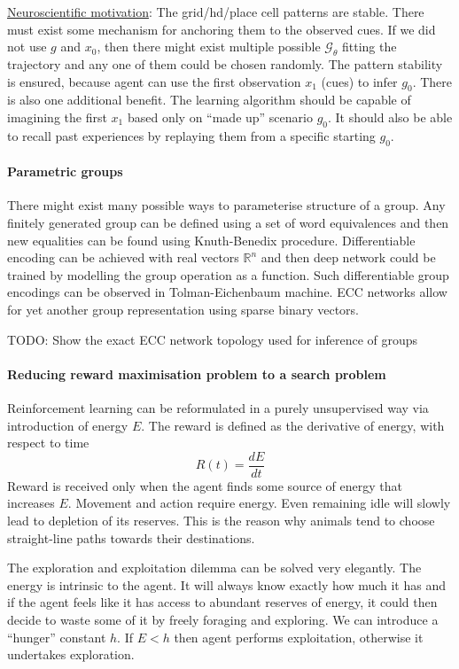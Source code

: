 \documentclass[12pt]{article}
\begin{document}
\underline{Neuroscientific motivation}: The grid/hd/place cell patterns are stable. There must exist some mechanism for anchoring them to the observed cues. If we did not use $g$ and $x_0$, then there might exist multiple possible $\mathcal{G}_\theta$ fitting the trajectory and any one of them could be chosen randomly. The pattern stability is ensured, because agent can use the first observation $x_1$ (cues) to infer $g_0$.
There is also one additional benefit. The learning algorithm should be capable of imagining the first $x_1$ based only on ``made up'' scenario $g_0$. It should also be able to recall past experiences by replaying them from a specific starting $g_0$.

\paragraph{Parametric groups}

There might exist many possible ways to parameterise structure of a group. Any finitely generated group can be defined using a set of word equivalences and then new equalities can be found using Knuth-Benedix procedure. Differentiable encoding can be achieved with real vectors $\mathbb{R}^n$ and then deep network could be trained by modelling the group operation as a function. Such differentiable group encodings can be observed in Tolman-Eichenbaum machine. ECC networks allow for yet another group representation using sparse binary vectors. 

TODO: Show the exact ECC network topology used for inference of groups


\paragraph{Reducing reward maximisation problem to a search problem}
Reinforcement learning can be reformulated in a purely unsupervised way via introduction of energy $E$. The reward is defined as the derivative of energy, with respect to time
\[
R(t) = \frac{dE}{dt}
\]
Reward is received only when the agent finds some source of energy that increases $E$.
Movement and action require energy. Even remaining idle will slowly lead to depletion of its reserves. This is the reason why animals tend to choose straight-line paths towards their destinations. 

The exploration and exploitation dilemma can be solved very elegantly. The energy is intrinsic to the agent. It will always know exactly how much it has and if the agent feels like it has access to abundant reserves of energy, it could then decide to waste some of it by freely foraging and exploring. We can introduce a ``hunger'' constant  $h$. If $E<h$ then agent performs exploitation, otherwise it undertakes exploration.
\end{document}
